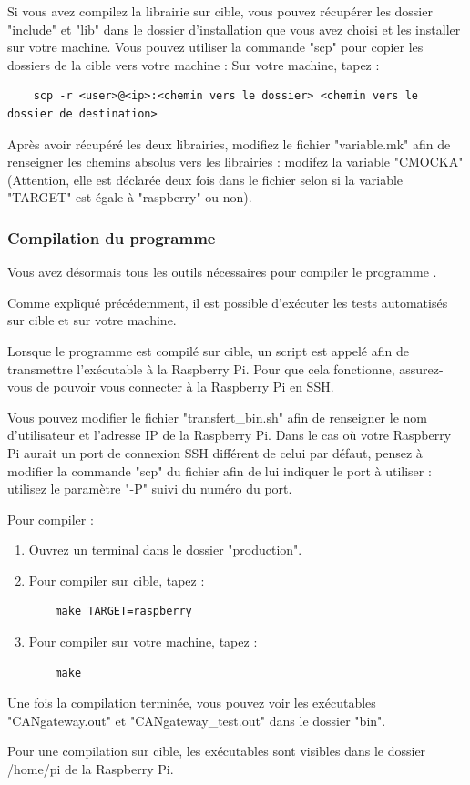 Si vous avez compilez la librairie sur cible, vous pouvez récupérer les dossier "include" et "lib" dans le dossier d'installation que vous avez choisi et les installer sur votre machine. \newline
Vous pouvez utiliser la commande "scp" pour copier les dossiers de la cible vers votre machine :
Sur votre machine, tapez : 
\vspace{-1.8\baselineskip} 
\begin{lstlisting}
    scp -r <user>@<ip>:<chemin vers le dossier> <chemin vers le dossier de destination>
\end{lstlisting}

Après avoir récupéré les deux librairies, modifiez le fichier "variable.mk" afin de renseigner les chemins absolus vers les librairies : modifez la variable "CMOCKA" (Attention, elle est déclarée deux fois dans le fichier selon si la variable "TARGET" est égale à "raspberry" ou non).

\subsubsection{Compilation du programme {\nomLogiciel}}

Vous avez désormais tous les outils nécessaires pour compiler le programme {\nomLogiciel}. \newline

Comme expliqué précédemment, il est possible d'exécuter les tests automatisés sur cible et sur votre machine. \newline

Lorsque le programme est compilé sur cible, un script est appelé afin de transmettre l'exécutable à la Raspberry Pi. Pour que cela fonctionne, assurez-vous de pouvoir vous connecter à la Raspberry Pi en SSH. \newline

Vous pouvez modifier le fichier "transfert\_bin.sh" afin de renseigner le nom d'utilisateur et l'adresse IP de la Raspberry Pi. \newline
Dans le cas où votre Raspberry Pi aurait un port de connexion SSH différent de celui par défaut, pensez à modifier la commande "scp" du fichier afin de lui indiquer le port à utiliser : utilisez le paramètre "-P" suivi du numéro du port. \newline

Pour compiler : 
\begin{enumerate}
    \item Ouvrez un terminal dans le dossier "production". 
    \item Pour compiler sur cible, tapez :
\vspace{-1.8\baselineskip} 
\begin{lstlisting}
    make TARGET=raspberry
\end{lstlisting}
\newpage
    \item Pour compiler sur votre machine, tapez :
\vspace{-1.8\baselineskip} 
\begin{lstlisting}
    make 
\end{lstlisting}
\end{enumerate}

Une fois la compilation terminée, vous pouvez voir les exécutables "CANgateway.out" et "CANgateway\_test.out" dans le dossier "bin". \newline

Pour une compilation sur cible, les exécutables sont visibles dans le dossier /home/pi de la Raspberry Pi. \newline
